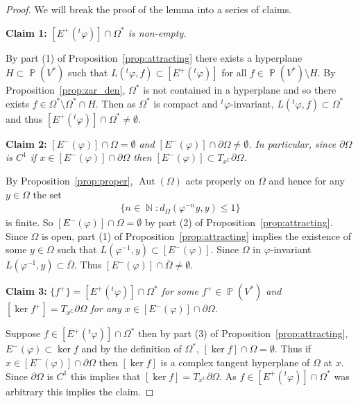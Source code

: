 \documentclass[12pt]{amsart}
\theoremstyle{plain}
\theoremstyle{definition}
\theoremstyle{remark}
\begin{document}
\begin{proof} We will break the proof of the lemma into a series of claims. \vspace*{5pt}

\noindent \textbf{Claim 1:} \textit{$[E^+(^t\varphi)] \cap \Omega^*$ is non-empty.} \vspace*{5pt}

By part (1) of Proposition~\ref{prop:attracting} there exists a hyperplane $H \subset \operatorname{\mathbb{P}}(V^*)$  such that $L(^t\varphi, f) \subset [E^+(^t\varphi)]$ for all $f \in \operatorname{\mathbb{P}}(V^*)\setminus H$. By Proposition~\ref{prop:zar_den}, $\Omega^*$ is not contained in a hyperplane and so there exists $f \in \Omega^* \setminus \Omega^* \cap H$. Then as $\Omega^*$ is compact and $^t\varphi$-invariant, $L(^t\varphi, f) \subset \Omega^*$ and thus $[E^+(^t\varphi)] \cap \Omega^* \neq \emptyset$. \vspace*{5pt}

\noindent \textbf{Claim 2:} \textit{$[E^-(\varphi)] \cap \Omega = \emptyset$ and $[E^-(\varphi)] \cap \partial \Omega \neq \emptyset$. In particular, since $\partial \Omega$ is $C^1$ if $x \in[E^-(\varphi)] \cap \partial\Omega$ then $[E^-(\varphi)] \subset T_x^\operatorname{\mathbb{C}} \partial \Omega$. }\vspace*{5pt}

By Proposition~\ref{prop:proper}, $\operatorname{Aut}(\Omega)$ acts properly on $\Omega$ and hence for any $y \in \Omega$ the set
\begin{align*}
\{ n \in \operatorname{\mathbb{N}} : d_{\Omega}(\varphi^{-n} y,y) \leq 1\}
\end{align*}
is finite. So $[E^-(\varphi)] \cap \Omega = \emptyset$ by part (2) of Proposition~\ref{prop:attracting}. Since $\Omega$ is open,  part (1) of Proposition~\ref{prop:attracting} implies the existence of some  $y \in \Omega$ such that  $L(\varphi^{-1}, y) \subset [E^-(\varphi)]$.  Since $\Omega$ in $\varphi$-invariant $L(\varphi^{-1},y) \subset \overline{\Omega}$. Thus  $[E^-(\varphi)] \cap \overline{\Omega} \neq \emptyset$. \vspace*{5pt}

\noindent \textbf{Claim 3:}  \textit{$\{ f^+ \} = [E^+(^t\varphi)] \cap \Omega^*$ for some $f^+ \in \operatorname{\mathbb{P}}(V^*)$ and $[\ker f^+] = T_x^\operatorname{\mathbb{C}} \partial \Omega$ for any $x \in [E^-(\varphi)] \cap \partial \Omega$. }\vspace*{5pt}

Suppose $f \in [E^+(^t\varphi)] \cap \Omega^*$ then by part (3) of Proposition~\ref{prop:attracting}, $E^-(\varphi) \subset \ker f$ and by the definition of $\Omega^*$, $[\ker f] \cap \Omega = \emptyset$. Thus if $x \in[E^-(\varphi)] \cap \partial \Omega$ then $[\ker f]$ is a complex tangent hyperplane of $\Omega$ at $x$. Since $\partial \Omega$ is $C^1$ this implies that $[\ker f] = T_x^\operatorname{\mathbb{C}} \partial \Omega$.  As $f \in [E^+(^t\varphi)] \cap \Omega^*$ was arbitrary this implies the claim.\vspace*{5pt}


\end{proof}
\end{document}
